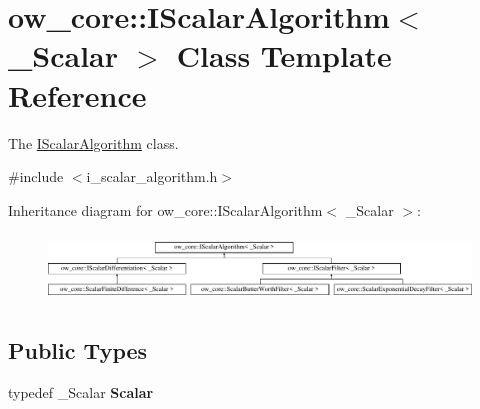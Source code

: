 \hypertarget{classow__core_1_1IScalarAlgorithm}{}\section{ow\+\_\+core\+:\+:I\+Scalar\+Algorithm$<$ \+\_\+\+Scalar $>$ Class Template Reference}
\label{classow__core_1_1IScalarAlgorithm}


The \hyperlink{classow__core_1_1IScalarAlgorithm}{I\+Scalar\+Algorithm} class.  




{\ttfamily \#include $<$i\+\_\+scalar\+\_\+algorithm.\+h$>$}

Inheritance diagram for ow\+\_\+core\+:\+:I\+Scalar\+Algorithm$<$ \+\_\+\+Scalar $>$\+:\begin{figure}[H]
\begin{center}
\leavevmode
\includegraphics[height=1.800643cm]{d6/d9d/classow__core_1_1IScalarAlgorithm}
\end{center}
\end{figure}
\subsection*{Public Types}
\begin{DoxyCompactItemize}
\item 
typedef \+\_\+\+Scalar {\bfseries Scalar}\hypertarget{classow__core_1_1IScalarAlgorithm_a2fd7fd37e85194d236a5175af64be9b0}{}\label{classow__core_1_1IScalarAlgorithm_a2fd7fd37e85194d236a5175af64be9b0}

\end{DoxyCompactItemize}

